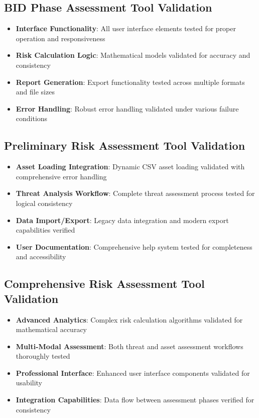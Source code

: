 \documentclass[binding=0.6cm]{sapthesis}
\begin{document}
\subsection{BID Phase Assessment Tool Validation}

\begin{itemize}
    \item \textbf{Interface Functionality}: All user interface elements tested for proper operation and responsiveness
    \item \textbf{Risk Calculation Logic}: Mathematical models validated for accuracy and consistency
    \item \textbf{Report Generation}: Export functionality tested across multiple formats and file sizes
    \item \textbf{Error Handling}: Robust error handling validated under various failure conditions
\end{itemize}

\subsection{Preliminary Risk Assessment Tool Validation}

\begin{itemize}
    \item \textbf{Asset Loading Integration}: Dynamic CSV asset loading validated with comprehensive error handling
    \item \textbf{Threat Analysis Workflow}: Complete threat assessment process tested for logical consistency
    \item \textbf{Data Import/Export}: Legacy data integration and modern export capabilities verified
    \item \textbf{User Documentation}: Comprehensive help system tested for completeness and accessibility
\end{itemize}

\subsection{Comprehensive Risk Assessment Tool Validation}

\begin{itemize}
    \item \textbf{Advanced Analytics}: Complex risk calculation algorithms validated for mathematical accuracy
    \item \textbf{Multi-Modal Assessment}: Both threat and asset assessment workflows thoroughly tested
    \item \textbf{Professional Interface}: Enhanced user interface components validated for usability
    \item \textbf{Integration Capabilities}: Data flow between assessment phases verified for consistency
\end{itemize}
\end{document}
